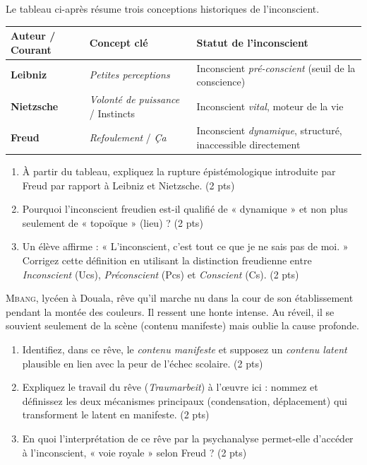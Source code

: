 \documentclass[11pt]{article}
\begin{document}
\begin{exercice}
Le tableau ci-après résume trois conceptions historiques de l'inconscient.
\begin{center}
\begin{tabularx}{\linewidth}{>{\bfseries}l X X}
\toprule
\textbf{Auteur / Courant} & \textbf{Concept clé} & \textbf{Statut de l'inconscient} \\
\midrule
Leibniz & \textit{Petites perceptions} & Inconscient \textit{pré-conscient} (seuil de la conscience) \\
Nietzsche & \textit{Volonté de puissance} / Instincts & Inconscient \textit{vital}, moteur de la vie \\
Freud & \textit{Refoulement} / \textit{Ça} & Inconscient \textit{dynamique}, structuré, inaccessible directement \\
\bottomrule
\end{tabularx}
\end{center}
\begin{enumerate}
    \item À partir du tableau, expliquez la rupture épistémologique introduite par Freud par rapport à Leibniz et Nietzsche. (2 pts)
    \item Pourquoi l'inconscient freudien est-il qualifié de « dynamique » et non plus seulement de « topoïque » (lieu) ? (2 pts)
    \item Un élève affirme : « L'inconscient, c'est tout ce que je ne sais pas de moi. » Corrigez cette définition en utilisant la distinction freudienne entre \textit{Inconscient} (Ucs), \textit{Préconscient} (Pcs) et \textit{Conscient} (Cs). (2 pts)
\end{enumerate}
\end{exercice}

\begin{exercice}
\textsc{Mbang}, lycéen à Douala, rêve qu'il marche nu dans la cour de son établissement pendant la montée des couleurs. Il ressent une honte intense. Au réveil, il se souvient seulement de la scène (contenu manifeste) mais oublie la cause profonde.
\begin{enumerate}
    \item Identifiez, dans ce rêve, le \textit{contenu manifeste} et supposez un \textit{contenu latent} plausible en lien avec la peur de l'échec scolaire. (2 pts)
    \item Expliquez le travail du rêve (\textit{Traumarbeit}) à l'œuvre ici : nommez et définissez les deux mécanismes principaux (condensation, déplacement) qui transforment le latent en manifeste. (2 pts)
    \item En quoi l'interprétation de ce rêve par la psychanalyse permet-elle d'accéder à l'inconscient, « voie royale » selon Freud ? (2 pts)
\end{enumerate}
\end{exercice}
\end{document}
